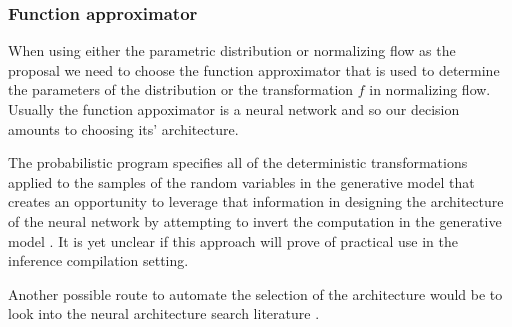 \documentclass[12pt]{article}
\begin{document}
\subsubsection*{Function approximator}
When using either the parametric distribution or normalizing flow as the proposal we need to choose the function approximator that is used to determine the parameters of the distribution or the transformation $f$ in normalizing flow.
Usually the function appoximator is a neural network and so our decision amounts to choosing its' architecture.

The probabilistic program specifies all of the deterministic transformations applied to the samples of the random variables in the generative model
that creates an opportunity to leverage that information in designing the architecture of the neural network by attempting to invert the computation in the generative model \citep{TavaresEtAl2016,TavaresEtAl2017}.
It is yet unclear if this approach will prove of practical use in the inference compilation setting.

Another possible route to automate the selection of the architecture would be to look into the neural architecture search literature \citep{ElskenEtAl2018,ZophLe2017,pham18a}.








% 
% 
\end{document}
